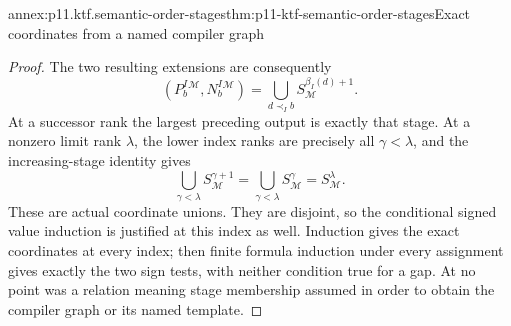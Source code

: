 \begin{annexitem}{annex:p11.ktf.semantic-order-stages}{thm:p11-ktf-semantic-order-stages}{Exact coordinates from a named compiler graph}
\begin{proof}
The two resulting extensions are consequently
\[
 (P^I_b{}^{\mathcal M},N^I_b{}^{\mathcal M})
       =\bigcup_{d\prec_I b}S_{\mathcal M}^{\beta_I(d)+1}.
\]
At a successor rank the largest preceding output is exactly that
stage. At a nonzero limit rank \(\lambda\), the lower index
ranks are precisely all \(\gamma<\lambda\), and the
increasing-stage identity gives
\[
 \bigcup_{\gamma<\lambda}S_{\mathcal M}^{\gamma+1}
   =\bigcup_{\gamma<\lambda}S_{\mathcal M}^{\gamma}
   =S_{\mathcal M}^{\lambda}.
\]
These are actual coordinate unions. They are disjoint, so the
conditional signed value induction is justified at this index as
well. Induction gives the exact coordinates at every index; then
finite formula induction under every assignment gives exactly the
two sign tests, with neither condition true for a gap. At no point
was a relation meaning stage membership assumed in order to obtain
the compiler graph or its named template.
\end{proof}
\end{annexitem}

